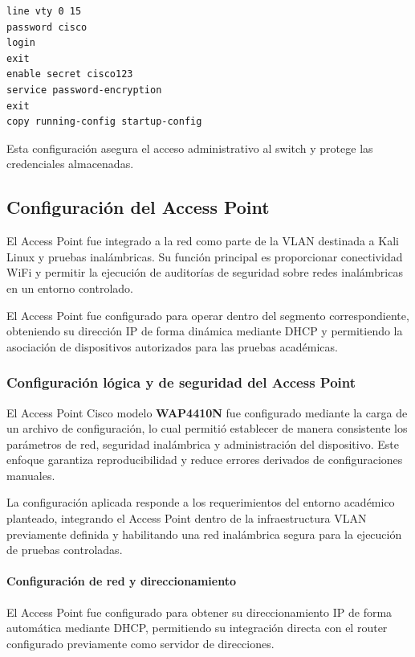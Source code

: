 \begin{lstlisting}[caption={Configuración de seguridad básica en el Switch}]
line vty 0 15
password cisco
login
exit
enable secret cisco123
service password-encryption
exit
copy running-config startup-config
\end{lstlisting}

Esta configuración asegura el acceso administrativo al switch y protege las credenciales almacenadas.

\subsection{Configuración del Access Point}

El Access Point fue integrado a la red como parte de la VLAN destinada a Kali Linux y pruebas inalámbricas. Su función principal es proporcionar conectividad WiFi y permitir la ejecución de auditorías de seguridad sobre redes inalámbricas en un entorno controlado.

El Access Point fue configurado para operar dentro del segmento correspondiente, obteniendo su dirección IP de forma dinámica mediante DHCP y permitiendo la asociación de dispositivos autorizados para las pruebas académicas.

\subsubsection{Configuración lógica y de seguridad del Access Point}

El Access Point Cisco modelo \textbf{WAP4410N} fue configurado mediante la carga de un archivo de configuración, lo cual permitió establecer de manera consistente los parámetros de red, seguridad inalámbrica y administración del dispositivo. Este enfoque garantiza reproducibilidad y reduce errores derivados de configuraciones manuales.

La configuración aplicada responde a los requerimientos del entorno académico planteado, integrando el Access Point dentro de la infraestructura VLAN previamente definida y habilitando una red inalámbrica segura para la ejecución de pruebas controladas.

\paragraph{Configuración de red y direccionamiento}

El Access Point fue configurado para obtener su direccionamiento IP de forma automática mediante DHCP, permitiendo su integración directa con el router configurado previamente como servidor de direcciones.

